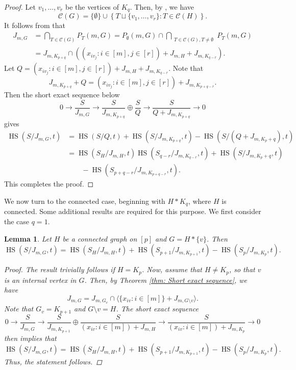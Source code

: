 \documentclass[12pt,reqno]{amsart}
\newcommand \hs{\operatorname{HS}}
\theoremstyle{plain}
\newtheorem{lemma}[theorem]{Lemma}
\theoremstyle{definition}
\begin{document}
\begin{proof}
   Let $v_1,\ldots,v_r$ be the vertices of $K_q$. Then, by \cite[Lemma 4.8]{HS-of-BEI-Arvind-Sarkar-2019}, we have \[\mathscr{C}(G)=\{\emptyset\}\cup\left\{T\sqcup\{v_1,\ldots,v_r\}:T\in \mathscr{C}(H)\right\}.\]
  It follows from \cite[Theorem 7]{GBI-Rauh-2013} that
 \begin{align*}
 J_{m,G}&=\bigcap_{T\in \mathscr{C}(G)}P_T(m,G)=P_{\emptyset}(m,G)\cap\bigcap_{\substack{T\in \mathscr{C}(G),T\neq \emptyset}}P_T(m,G)\\
 &=J_{m,K_{p+q}}\cap\left((x_{iv_j}:i\in [m], j\in[r])+J_{m,H}+J_{m,K_{q-r}}\right).\end{align*}
 Let $Q=(x_{iv_j}:i\in [m], j\in[r])+J_{m,H}+J_{m,K_{q-r}}$. Note that $$J_{m,K_{p+q}}+Q=(x_{iv_j}:i\in [m], j\in[r])+J_{m,K_{p+q-r}}.$$ Then the short exact sequence below 
 \[ 0\rightarrow{\frac{S}{J_{m,G}}}\rightarrow \frac{S}{J_{m,K_{p+q}}}\oplus \frac{S}{Q}\rightarrow \frac{S}{Q+J_{m,K_{p+q}}}\rightarrow 0\] gives
 \begin{align*}  
 \hs(S/J_{m,G},t)&=\hs(S/Q,t)+\hs(S/J_{m,K_{p+q}},t)-\hs(S/(Q+J_{m,K_p+q}),t)\\
    &=\hs(S_H/J_{m,H},t)\hs(S_{{q-r}}/J_{m,K_{q-r}},t)+\hs(S/{J_{m,K_p+q}},t)\\
    &\quad\quad-\hs(S_{{p+q-r}}/J_{m,K_{p+q-r}},t).
 \end{align*} This completes the proof.
\end{proof}
We now turn to the connected case, beginning with \(H*K_q\), where \(H\) is connected. Some additional results are required for this purpose. We first consider the case \(q=1\).
\begin{lemma}\label{lemma: HS of connected and a vertex}
    Let $H$ be a connected graph on $[p]$ and $G=H*\{v\}$. Then 
    $$\hs(S/J_{m,G},t)=\hs(S_H/J_{m,H},t)+\hs(S_{p+1}/J_{m,K_{p+1}},t)-\hs(S_p/J_{m,K_p},t).$$
    \begin{proof}
        The result trivially follows if $H=K_p$. Now, assume that $H\neq K_p$, so that $v$ is an internal vertex in $G$. Then, by Theorem \ref{thm: Short exact sequence}, we have $$J_{m,G}=J_{m,{G_v}}\cap \langle\{ x_{iv}:i\in [m]\}+J_{m,{G\setminus v}}\rangle.$$ Note that $G_v=K_{p+1}$ and $G\setminus v=H$. The short exact sequence
        \[ 0\rightarrow{\frac{S}{J_{m,G}}}\rightarrow \frac{S}{J_{m,K_{p+1}}}\oplus \frac{S}{(x_{iv}:i\in [m])+J_{m,H}}\rightarrow \frac{S}{(x_{iv}:i\in [m])+J_{m,K_{p}}}\rightarrow 0\] then implies that 
         $$\hs(S/J_{m,G},t)=\hs(S_H/J_{m,H},t)+\hs(S_{p+1}/J_{m,K_{p+1}},t)-\hs(S_p/J_{m,K_p},t).$$ Thus, the statement follows.
    \end{proof}
\end{lemma}
\end{document}
